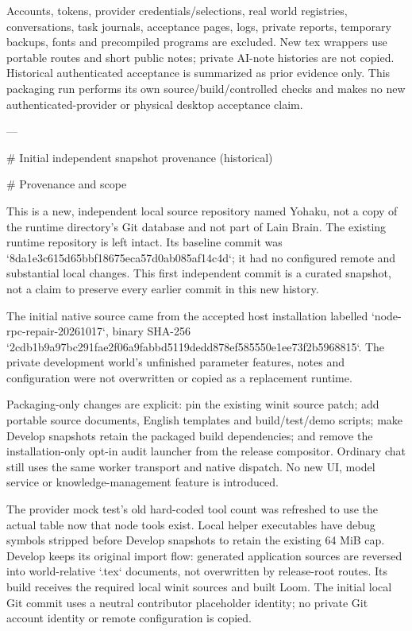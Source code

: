 Accounts, tokens, provider credentials/selections, real world registries,
conversations, task journals, acceptance pages, logs, private reports, temporary
backups, fonts and precompiled programs are excluded. New tex wrappers use
portable routes and short public notes; private AI-note histories are not copied.
Historical authenticated acceptance is summarized as prior evidence only.
This packaging run performs its own source/build/controlled checks and makes no
new authenticated-provider or physical desktop acceptance claim.

---

# Initial independent snapshot provenance (historical)

# Provenance and scope

This is a new, independent local source repository named Yohaku, not a copy of
the runtime directory's Git database and not part of Lain Brain. The existing
runtime repository is left intact. Its baseline commit was
`8da1e3c615d65bbf18675eca57d0ab085af14c4d`; it had no configured remote and
substantial local changes. This first independent commit is a curated snapshot,
not a claim to preserve every earlier commit in this new history.

The initial native source came from the accepted host installation labelled
`node-rpc-repair-20261017`, binary SHA-256
`2cdb1b9a97bc291fae2f06a9fabbd5119dedd878ef585550e1ee73f2b5968815`.
The private development world's unfinished parameter features, notes and
configuration were not overwritten or copied as a replacement runtime.

Packaging-only changes are explicit: pin the existing winit source patch;
add portable source documents, English templates and build/test/demo scripts;
make Develop snapshots retain the packaged build dependencies; and remove the
installation-only opt-in audit launcher from the release compositor. Ordinary
chat still uses the same worker transport and native dispatch. No new UI,
model service or knowledge-management feature is introduced.

The provider mock test's old hard-coded tool count was refreshed to use the
actual table now that node tools exist. Local helper executables have debug
symbols stripped before Develop snapshots to retain the existing 64 MiB cap.
Develop keeps its original import flow: generated application sources are
reversed into world-relative `.tex` documents, not overwritten by release-root
routes. Its build receives the required local winit sources and built Loom.
The initial local Git commit uses a neutral contributor placeholder identity;
no private Git account identity or remote configuration is copied.

